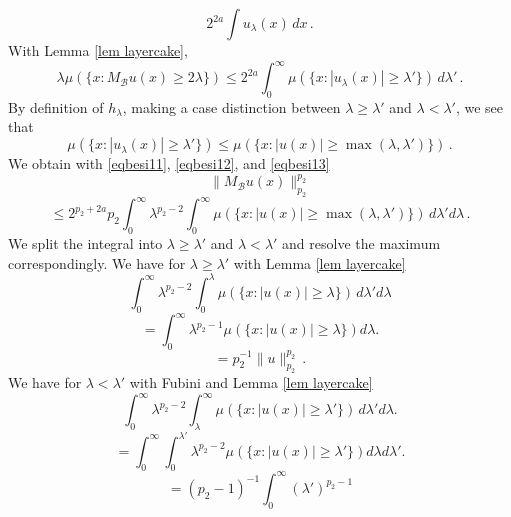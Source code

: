 {\begin{equation}
   2^{2a}
    \int u_\lambda (x)\, dx\, .
\end{equation}
With Lemma \ref{lem layercake},
\begin{equation}\label{eqbesi12}
    \lambda \mu(\{x: M_{\mathcal{B}}u(x)\ge 2\lambda\})\le
   2^{2a}
    \int_0^\infty  \mu (\{x: |u_\lambda (x)|\ge \lambda'\})\, d\lambda'\, .
\end{equation}
By definition of $h_\lambda$, making a case distinction between $\lambda\ge \lambda'$ and $\lambda <\lambda'$, we see that
\begin{equation}\label{eqbesi13}
   \mu (\{x: |u_\lambda (x)|\ge \lambda'\})
   \le
   \mu (\{x: |u (x)|\ge \max(\lambda,\lambda')\})\, .
\end{equation}
We obtain with \eqref{eqbesi11},
\eqref{eqbesi12}, and \eqref{eqbesi13}
\begin{equation}
    \|M_{\mathcal{B}}u(x)\|_{p_2}^{p_2}
 \end{equation}
 \begin{equation}
   \le 2^{p_2+2a} p_2
   \int_0^\infty \lambda^{p_2-2}
   \int_0^\infty
   \mu (\{x: |u (x)|\ge \max(\lambda,\lambda')\})
   \, d\lambda'd\lambda\, .
\end{equation}
We split the integral  into $\lambda\ge \lambda'$ and $\lambda<\lambda'$ and resolve the
maximum correspondingly.
We have for $\lambda\ge \lambda'$
with Lemma \ref{lem layercake}
\begin{equation}
    \int_0^\infty \lambda^{p_2-2}
   \int_0^\lambda
   \mu (\{x: |u (x)|\ge \lambda\})
   \, d\lambda'd\lambda
\end{equation}
\begin{equation}
   =\int_0^\infty \lambda^{p_2-1}
     \mu (\{x: |u (x)|\ge \lambda\})
d\lambda.
\end{equation}
\begin{equation}\label{eqbesi14}
   =p_2^{-1} \|u\|_{p_2}^{p_2}\, .
\end{equation}
We have for $\lambda< \lambda'$
with Fubini and Lemma \ref{lem layercake}
\begin{equation}
    \int_0^\infty \lambda^{p_2-2}
   \int_\lambda^\infty
   \mu (\{x: |u(x)|\ge \lambda'\})
   \, d\lambda'd\lambda.
\end{equation}
\begin{equation}
   =\int_0^\infty \int_0^{\lambda'}\lambda^{p_2-2}
     \mu (\{x: |u (x)|\ge \lambda'\})
d\lambda d\lambda'.
\end{equation}
\begin{equation}
   =(p_2-1)^{-1}\int_0^\infty (\lambda')^{p_2-1}

\end{equation}}
